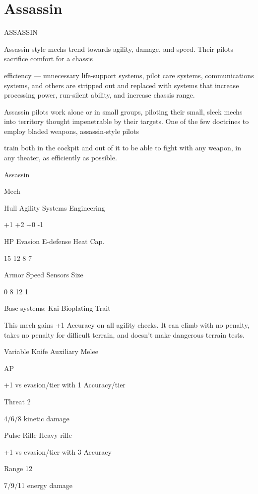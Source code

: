 \section{Assassin}

                                                 ASSASSIN  

Assassin style mechs trend towards agility, damage, and speed. Their pilots sacrifice comfort for a chassis  

efficiency — unnecessary life-support systems, pilot care systems, communications systems, and others  
are stripped out and replaced with systems that increase processing power, run-silent ability, and increase  
chassis range.   

Assassin pilots work alone or in small groups, piloting their small, sleek mechs into territory thought  
impenetrable by their targets. One of the few doctrines to employ bladed weapons, assassin-style pilots  

train both in the cockpit and out of it to be able to fight with any weapon, in any theater, as efficiently as  
possible.   

 Assassin 

 Mech 

 Hull        Agility      Systems        Engineering 

 +1          +2           +0             -1 

 HP          Evasion      E-defense      Heat Cap. 

  15         12           8              7 

 Armor       Speed        Sensors       Size 

 0           8            12             1 

Base systems:  
Kai Bioplating  
Trait
 
This mech gains +1 Accuracy on all agility checks. It can climb with no penalty, takes no penalty  
for difficult terrain, and doesn’t make dangerous terrain tests.
 

Variable Knife  
Auxiliary Melee
 
AP
 
+1 vs evasion/tier with 1 Accuracy/tier
 
Threat 2
 
4/6/8 kinetic damage
 

Pulse Rifle  
Heavy rifle
 
+1 vs evasion/tier with 3 Accuracy
 
Range 12
 
7/9/11 energy damage
 

